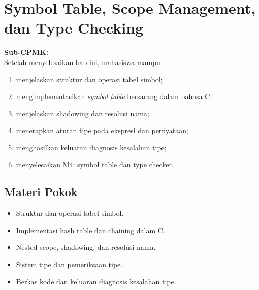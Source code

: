 \documentclass[../../main.tex]{subfiles}
\begin{document}
\chapter[Symbol Table dan Type Checking]{Symbol Table, Scope Management,\\ dan Type Checking}
\label{chap:symbol-table}

\begin{outcomebox}
\textbf{Sub-CPMK:} \\[3pt]
Setelah menyelesaikan bab ini, mahasiswa mampu:
\begin{enumerate}[label=\arabic*.,leftmargin=*]
  \item menjelaskan struktur dan operasi tabel simbol;
  \item mengimplementasikan \textit{symbol table} bersarang dalam
        bahasa C;
  \item menjelaskan shadowing dan resolusi nama;
  \item menerapkan aturan tipe pada ekspresi dan pernyataan;
  \item menghasilkan keluaran diagnosis kesalahan tipe;
  \item menyelesaikan M4: symbol table dan type checker.
\end{enumerate}
\end{outcomebox}

\section*{Materi Pokok}
\begin{itemize}[leftmargin=*]
  \item Struktur dan operasi tabel simbol.
  \item Implementasi hash table dan chaining dalam C.
  \item Nested scope, shadowing, dan resolusi nama.
  \item Sistem tipe dan pemeriksaan tipe.
  \item Berkas kode dan keluaran diagnosis kesalahan tipe.
\end{itemize}















\ifSubfilesClassLoaded{%
}{}
\end{document}
